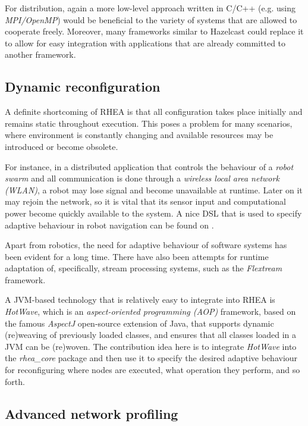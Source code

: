 \documentclass[sigplan,review,anonymous]{acmart}\settopmatter{printfolios=true,printacmref=false}
\begin{document}
For distribution, again a more low-level approach written in C/C++ (e.g. using \textit{MPI/OpenMP}) would be beneficial to the variety of systems that are allowed to cooperate freely. Moreover, many frameworks similar to Hazelcast could replace it to allow for easy integration with applications that are already committed to another framework.

\subsection{Dynamic reconfiguration}

A definite shortcoming of \textsc{RHEA} is that all configuration takes place initially and remains static throughout execution. This poses a problem for many scenarios, where environment is constantly changing and available resources may be introduced or become obsolete.

For instance, in a distributed application that controls the behaviour of a \textit{robot swarm} and all communication is done through a \textit{wireless local area network (WLAN)}, a robot may lose signal and become unavailable at runtime. Later on it may rejoin the network, so it is vital that its sensor input and computational power become quickly available to the system. A nice DSL that is used to specify adaptive behaviour in robot navigation can be found on \cite{reconf_robot}.

Apart from robotics, the need for adaptive behaviour of software systems has been evident for a long time\cite{reconf_survey}. There have also been attempts for runtime adaptation of, specifically, stream processing systems, such as the \textit{Flextream} framework\cite{flextream}.

A JVM-based technology that is relatively easy to integrate into \textsc{RHEA} is \textit{HotWave}\cite{reconf_java}, which is an \textit{aspect-oriented programming (AOP)} framework, based on the famous \textit{AspectJ} open-source extension of Java, that supports dynamic (re)weaving of previously loaded classes, and ensures that all classes loaded in a JVM can be (re)woven. The contribution idea here is to integrate \textit{HotWave} into the \textit{rhea\_core} package and then use it to specify the desired adaptive behaviour for reconfiguring where nodes are executed, what operation they perform, and so forth.

\subsection{Advanced network profiling}
\end{document}
